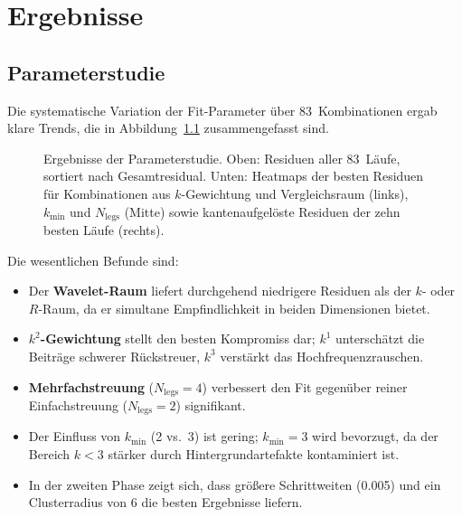 \chapter{Ergebnisse}
\label{ch:auswertung}

\section{Parameterstudie}
\label{sec:ergebnisse-paramscan}

Die systematische Variation der Fit-Parameter über 83~Kombinationen
ergab klare Trends, die in Abbildung~\ref{fig:param-scan} zusammengefasst
sind.

\begin{figure}[htbp]
  \centering
  \caption{Ergebnisse der Parameterstudie.
    Oben: Residuen aller 83~Läufe, sortiert nach Gesamtresidual.
    Unten: Heatmaps der besten Residuen für Kombinationen aus
    $k$-Gewichtung und Vergleichsraum (links), $k_{\min}$ und
    $N_{\text{legs}}$ (Mitte) sowie kantenaufgelöste Residuen der
    zehn besten Läufe (rechts).}
  \label{fig:param-scan}
\end{figure}

Die wesentlichen Befunde sind:
\begin{itemize}[nosep]
  \item Der \textbf{Wavelet-Raum} liefert durchgehend niedrigere
        Residuen als der $k$- oder $R$-Raum, da er simultane Empfindlichkeit
        in beiden Dimensionen bietet.
  \item \textbf{$k^2$-Gewichtung} stellt den besten Kompromiss dar;
        $k^1$ unterschätzt die Beiträge schwerer Rückstreuer,
        $k^3$ verstärkt das Hochfrequenzrauschen.
  \item \textbf{Mehrfachstreuung} ($N_{\text{legs}} = 4$) verbessert
        den Fit gegenüber reiner Einfachstreuung ($N_{\text{legs}} = 2$)
        signifikant.
  \item Der Einfluss von $k_{\min}$ (\num{2} vs.\ \num{3}) ist gering;
        $k_{\min} = 3$ wird bevorzugt, da der Bereich $k < 3$ stärker
        durch Hintergrundartefakte kontaminiert ist.
  \item In der zweiten Phase zeigt sich, dass größere Schrittweiten
        (\SI{0.005}{\Angstrom}) und ein Clusterradius von \SI{6}{\Angstrom}
        die besten Ergebnisse liefern.
\end{itemize}

